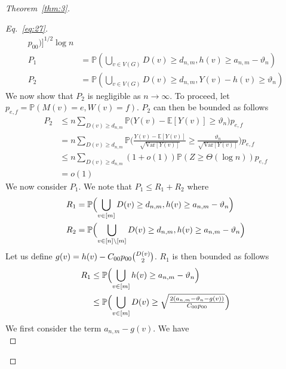 \documentclass[draftcls]{IEEEtran}
\theoremstyle{definition}
\begin{document}
\begin{proof}[Theorem~\ref{thm:3}]
\begin{proof}[Eq.~\eqref{eq:27}]
\begin{align*}
    p_{00})\Bigr]^{1/2} \log{n} \\
    P_1 &= \mathbb{P}(\bigcup_{v \in V(G)} D(v) \geq d_{n,m}, h(v) \geq
    a_{n,m} - \vartheta_n) \\
    P_2 &= \mathbb{P}(\bigcup_{v \in V(G)} D(v) \geq d_{n,m},
    Y(v) - h(v) \geq \vartheta_n)
  \end{align*}
  We now show that $P_2$ is negligible as $n \rightarrow \infty$. To
  proceed, let $p_{e,f} = \mathbb{P}(M(v) = e, W(v) =
f)$. $P_2$ can then be bounded as follows
\begin{equation*}
  \begin{split}
    P_2 & \leq n \sum_{D(v) \geq
        d_{n,m}}{\mathbb{P}\biggl( Y(v) - \mathbb{E}[Y(v)] \geq
        \vartheta_n \biggr) p_{e,f}}
  \\
  &= n \sum_{D(v) \geq d_{n,m}}{\mathbb{P}\biggl(
    \tfrac{Y(v) - \mathbb{E}[Y(v)]}{\sqrt{\mathrm{Var}[Y(v)]}} \geq
    \tfrac{\vartheta_n}{\sqrt{\mathrm{Var}[Y(v)]}} \biggr) p_{e,f}} \\
    &\leq n \sum_{D(v) \geq d_{n,m}} (1 + o(1)) \mathbb{P}(Z \geq \Theta(\log{n})) p_{e,f} \\
    &= o(1)
  \end{split}
\end{equation*}
We now consider $P_1$. We note that $P_1 \leq R_1 + R_2$
where
\begin{align*}
  R_1 &= \mathbb{P}\Bigl(\bigcup_{v \in [m]} D(v) \geq
  d_{n,m}, h(v) \geq a_{n,m} - \vartheta_n \Bigr) \\  
  R_2 &= \mathbb{P}\Bigl(\bigcup_{v \in [n] \setminus [m]} D(v) \geq
  d_{n,m}, h(v) \geq a_{n,m} - \vartheta_n \Bigr)
\end{align*}
Let us define $g(v) = h(v) - C_{00}p_{00} \tbinom{D(v)}{2}$.
$R_1$ is then bounded as follows
\begin{equation}
  \begin{split}
    \label{eq:36}
    R_1 &\leq \mathbb{P}\Bigl( \bigcup_{v \in [m]} h(v) \geq
    a_{n,m} - \vartheta_{n} \Bigr) \\
    &\leq \mathbb{P}\Bigl(\bigcup_{v \in [m]} D(v) \geq
      \sqrt{\tfrac{2 (a_{n,m} - \vartheta_n -
        g(v))}{C_{00} p_{00}}} \Bigr)
  \end{split}
\end{equation}
We first consider the term $a_{n,m} - g(v)$. We have
\begin{equation*}

\end{equation*}
\end{proof}
\end{proof}
\end{document}
